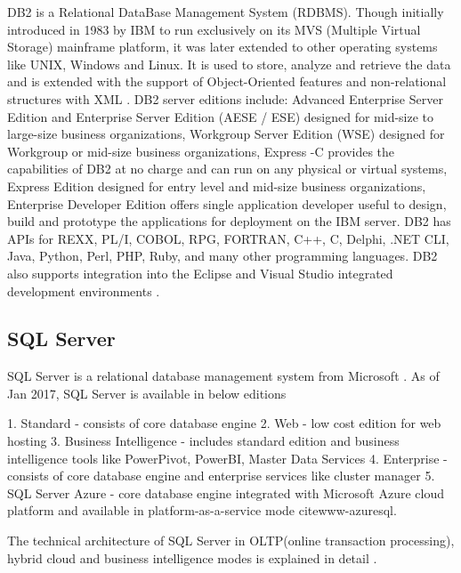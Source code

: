      DB2 is a Relational DataBase Management System (RDBMS). Though
     initially introduced in 1983 by IBM to run exclusively on its MVS
     (Multiple Virtual Storage) mainframe platform, it was later
     extended to other operating systems like UNIX, Windows and
     Linux. It is used to store, analyze and retrieve the data and is
     extended with the support of Object-Oriented features and
     non-relational structures with XML \cite{www-DB2Intro}. DB2
     server editions include: Advanced Enterprise Server Edition and
     Enterprise Server Edition (AESE / ESE) designed for mid-size to
     large-size business organizations, Workgroup Server Edition (WSE)
     designed for Workgroup or mid-size business organizations,
     Express -C provides the capabilities of DB2 at no charge and can
     run on any physical or virtual systems, Express Edition designed
     for entry level and mid-size business organizations, Enterprise
     Developer Edition offers single application developer useful to
     design, build and prototype the applications for deployment on
     the IBM server. DB2 has APIs for REXX, PL/I, COBOL, RPG, FORTRAN,
     C++, C, Delphi, .NET CLI, Java, Python, Perl, PHP, Ruby, and many
     other programming languages. DB2 also supports integration into
     the Eclipse and Visual Studio integrated development environments
     \cite{www-DB2Wiki}.

\subsection{SQL Server}

     SQL Server is a relational database
     management system from Microsoft \cite{www-sqlserver-wiki}.
     As of Jan 2017, SQL Server is
     available in below editions

     1. Standard - consists of core database engine
     2. Web - low cost edition for web hosting
     3. Business Intelligence - includes standard edition and business
        intelligence tools like PowerPivot, PowerBI, Master Data Services
     4. Enterprise - consists of core database engine and enterprise services
        like cluster manager
     5. SQL Server Azure - core database engine
        integrated with Microsoft Azure cloud platform and available in
        platform-as-a-service mode cite{www-azuresql}.

     The technical architecture of
     SQL Server in OLTP(online transaction processing), hybrid cloud
     and business intelligence modes is explained in detail \cite{book-sqlserver}.

